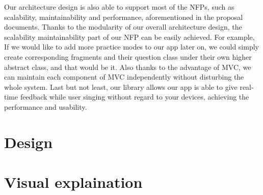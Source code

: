 \documentclass{article}
\begin{document}
Our architecture design is also able to support most of the NFPs, such as scalability, maintainability and performance, aforementioned in the proposal documents. Thanks to the modularity of our overall architecture design, the scalability maintainability part of our NFP can be easily achieved. For example, If we would like to add more practice modes to our app later on, we could simply create corresponding fragments and their question class under their own higher abstract class, and that would be it. Also thanks to the advantage of MVC, we can maintain each component of MVC independently without disturbing the whole system. Last but not least, our library allows our app is able to give real-time feedback while user singing without regard to your devices, achieving the performance and usability.

\qquad


\section{Design}
\label{sec:Design}

\section{Visual explaination}


\end{document}
